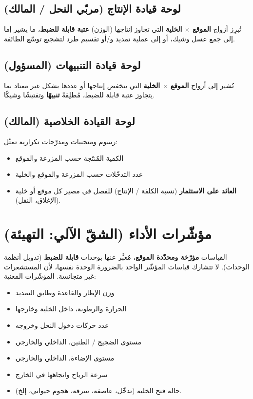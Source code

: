 \subsection{لوحة قيادة الإنتاج (مربّي النحل / المالك)}
تُبرِز أزواج \textbf{الموقع $\times$ الخلية} التي تجاوز إنتاجها (الوزن)
\textbf{عتبة قابلة للضبط}، ما يشير إما إلى جمع عسل وشيك، أو إلى عملية تمديد و/أو
تقسيم طرد لتشجيع توسّع الطائفة.

\subsection{لوحة قيادة التنبيهات (المسؤول)}
تُشير إلى أزواج \textbf{الموقع $\times$ الخلية} التي ينخفض إنتاجها أو عددها بشكل
غير معتاد بما يتجاوز عتبة قابلة للضبط، مُطلِقةً \textbf{تنبيهًا} وتفتيشًا وشيكًا.

\subsection{لوحة القيادة الخلاصية (المالك)}
رسوم ومنحنيات ومدرّجات تكرارية تمثّل:
\begin{itemize}
  \item الكمية المُنتَجة حسب المزرعة والموقع
  \item عدد التدخّلات حسب المزرعة والموقع والخلية
  \item \textbf{العائد على الاستثمار} (نسبة الكلفة / الإنتاج) للفصل في مصير كل موقع أو خلية (الإغلاق، النقل).
\end{itemize}

\section{مؤشّرات الأداء (الشقّ الآلي: التهيئة)}
القياسات \textbf{مؤرّخة ومحدّدة الموقع}، مُعبَّر عنها بوحدات \textbf{قابلة
للضبط} (تدويل أنظمة الوحدات). لا تتشارك قياسات المؤشّر الواحد بالضرورة الوحدة
نفسها، لأن المستشعرات غير متجانسة. المؤشّرات المعنية:
\begin{itemize}
  \item وزن الإطار والقاعدة وطابق التمديد
  \item الحرارة والرطوبة، داخل الخلية وخارجها
  \item عدد حركات دخول النحل وخروجه
  \item مستوى الضجيج / الطنين، الداخلي والخارجي
  \item مستوى الإضاءة، الداخلي والخارجي
  \item سرعة الرياح واتجاهها في الخارج
  \item حالة فتح الخلية (تدخّل، عاصفة، سرقة، هجوم حيواني، إلخ).
\end{itemize}

